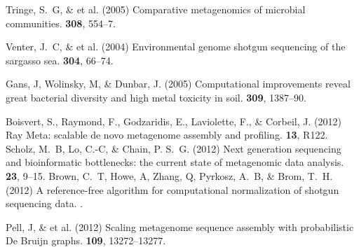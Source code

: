 \documentclass{pnastwo}
\begin{document}
\begin{article}
\begin{thebibliography}{10}
 Tringe, S.~G, \& et al. \newblock (2005) Comparative
metagenomics of microbial communities.  {\bf 308},
554--7.
%
%


 Venter, J.~C, \& et al. \newblock (2004) Environmental genome shotgun sequencing of the sargasso
sea.  {\bf 304}, 66--74.
%

 Gans, J, Wolinsky, M, \& Dunbar, J. \newblock (2005)
Computational improvements reveal great bacterial diversity and high metal
toxicity in soil.  {\bf 309}, 1387--90.

 Boisvert, S., Raymond, F., Godzaridis, E., Laviolette, F., \& Corbeil, J. \newblock (2012) Ray Meta:
scalable de novo metagenome assembly and profiling.  {\bf 13}, R122.
 Scholz, M.~B, Lo, C.-C, \& Chain, P. S.~G. \newblock
(2012) Next generation sequencing and bioinformatic bottlenecks: the current
state of metagenomic data analysis.  {\bf 23}, 9--15.
%
 Brown, C.~T, Howe, A, Zhang, Q, Pyrkosz, A.~B, \& Brom,
T.~H. \newblock (2012) A reference-free algorithm for computational
normalization of shotgun sequencing data. .
%

 Pell, J, \& et al. \newblock (2012) {Scaling metagenome sequence assembly
with probabilistic De Bruijn graphs}.  {\bf 109}, 13272--13277.


\end{thebibliography}
\end{article}
\end{document}

